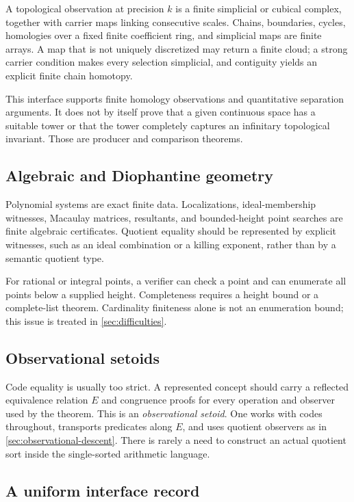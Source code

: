 A topological observation at precision \(k\) is a finite simplicial or cubical complex, together with carrier maps linking consecutive scales.  Chains, boundaries, cycles, homologies over a fixed finite coefficient ring, and simplicial maps are finite arrays.  A map that is not uniquely discretized may return a finite cloud; a strong carrier condition makes every selection simplicial, and contiguity yields an explicit finite chain homotopy.

This interface supports finite homology observations and quantitative separation arguments.  It does not by itself prove that a given continuous space has a suitable tower or that the tower completely captures an infinitary topological invariant.  Those are producer and comparison theorems.

\subsection{Algebraic and Diophantine geometry}

Polynomial systems are exact finite data.  Localizations, ideal-membership witnesses, Macaulay matrices, resultants, and bounded-height point searches are finite algebraic certificates.  Quotient equality should be represented by explicit witnesses, such as an ideal combination or a killing exponent, rather than by a semantic quotient type.

For rational or integral points, a verifier can check a point and can enumerate all points below a supplied height.  Completeness requires a height bound or a complete-list theorem.  Cardinality finiteness alone is not an enumeration bound; this issue is treated in \cref{sec:difficulties}.

\subsection{Observational setoids}

Code equality is usually too strict.  A represented concept should carry a reflected equivalence relation \(E\) and congruence proofs for every operation and observer used by the theorem.  This is an \emph{observational setoid}.  One works with codes throughout, transports predicates along \(E\), and uses quotient observers as in \cref{sec:observational-descent}.  There is rarely a need to construct an actual quotient sort inside the single-sorted arithmetic language.

\subsection{A uniform interface record}

